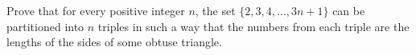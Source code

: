 Prove that for every positive integer $n$, the set $\{2, 3, 4, \ldots, 3n + 1\}$ can be partitioned into $n$ triples in such a way that the numbers from each triple are the lengths of the sides of some obtuse triangle.
